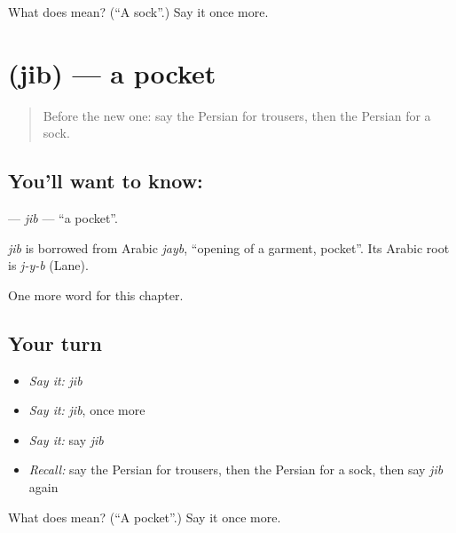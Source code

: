 \begin{tcolorbox}[breakable,colback=teal!4,colframe=teal!35!black,title={Before you move on}]
What does  mean? (\textquotedblleft{}A sock\textquotedblright{}.) Say it once more.
\end{tcolorbox}
\section[\texorpdfstring{\fa{جیب} (jib)}{جیب (jib)}]{ (jib) — a pocket}

\label{lesson:FA-C74-jib}



\begin{quote}
Before the new one: say the Persian for trousers, then the Persian for a sock.
\end{quote}

\subsection*{You'll want to know: }
\textbf{} — \emph{jib} — \textquotedblleft{}a pocket\textquotedblright{}.

\begin{cousinweb}
\emph{jib} is borrowed from Arabic \emph{jayb}, \textquotedblleft{}opening of a garment, pocket\textquotedblright{}. Its Arabic root is \emph{j-y-b} (Lane).
\end{cousinweb}

\begin{grammarlens}[title={What you've built}]
One more word for this chapter.
\end{grammarlens}

\subsection*{Your turn}
\begin{itemize}
\raggedright
  \item \emph{Say it:} \emph{jib}
  \item \emph{Say it:} \emph{jib}, once more
  \item \emph{Say it:} say \emph{jib}
  \item \emph{Recall:} say the Persian for trousers, then the Persian for a sock, then say \emph{jib} again
\end{itemize}

\begin{tcolorbox}[breakable,colback=teal!4,colframe=teal!35!black,title={Before you move on}]
What does  mean? (\textquotedblleft{}A pocket\textquotedblright{}.) Say it once more.
\end{tcolorbox}
